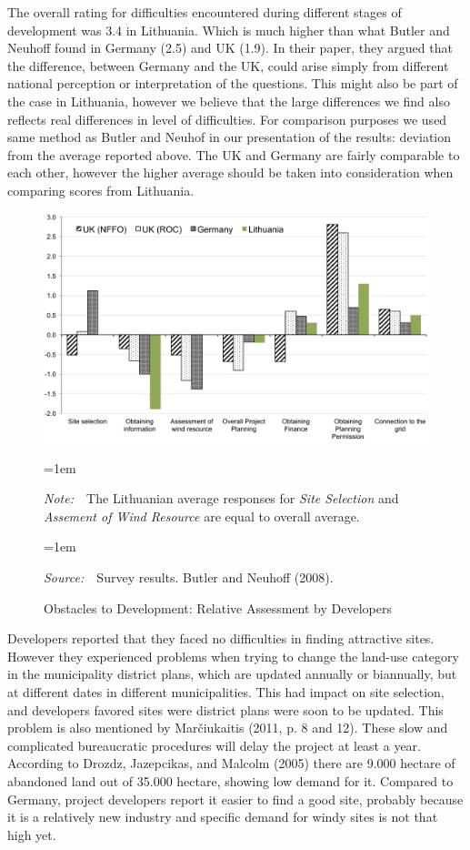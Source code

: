 \documentclass[a4paper, 12pt]{article}
\newcommand{\Figtext}[1]{%
	\begin{tablenotes}[para,flushleft]
		\hangindent=1em
		\footnotesize
		\raggedright
		#1
	\end{tablenotes}
}
\newcommand{\Fignote}[1]{\Figtext{\emph{Note:~}~#1}}
\newcommand{\Figsource}[1]{\Figtext{\emph{Source:~}~#1}}
\begin{document}
The overall rating for difficulties encountered during different stages of development was 3.4 in Lithuania. Which is much higher than what Butler and Neuhoff found in Germany (2.5) and UK (1.9). In their paper, they argued that the difference, between Germany and the UK, could arise simply from different national perception or interpretation of the questions. This might also be part of the case in Lithuania, however we believe that the large differences we find also reflects real differences in level of difficulties. For comparison purposes we used same method as Butler and Neuhof in our presentation of the results: deviation from the average reported above. The UK and Germany are fairly comparable to each other, however the higher average should be taken into consideration when comparing scores from Lithuania.

\begin{figure}
	\centering
	\caption{Obstacles to Development: Relative Assessment by Developers}
	\includegraphics[width=1\textwidth]{fig_survey_barriers}
	\Fignote{The Lithuanian average responses for \emph{Site Selection} and \emph{Assement of Wind Resource} are equal to overall average.}
	\Figsource{Survey results. Butler and Neuhoff (2008).}
	\label{fig:fig_survey_barriers}
\end{figure}

Developers reported that they faced no difficulties in finding attractive sites. However they experienced problems when trying to change the land-use category in the municipality district plans, which are updated annually or biannually, but at different dates in different municipalities. This had impact on site selection, and developers favored sites were district plans were soon to be updated. This problem is also mentioned by Marčiukaitis (2011, p. 8 and 12). These slow and complicated bureaucratic procedures will delay the project at least a year. According to Drozdz, Jazepcikas, and Malcolm (2005) there are 9.000 hectare of abandoned land out of 35.000 hectare, showing low demand for it. Compared to Germany, project developers report it easier to find a good site, probably because it is a relatively new industry and specific demand for windy sites is not that high yet.
\end{document}

